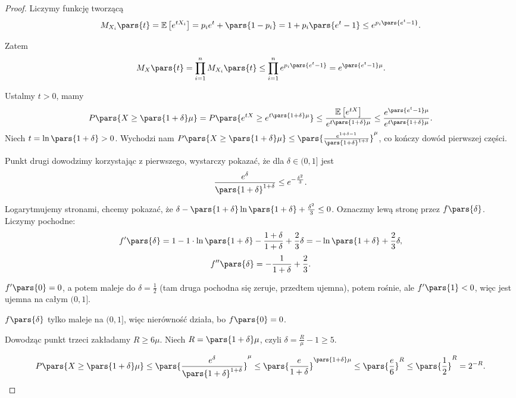 \begin{proof}
	Liczymy funkcję tworzącą \[M_{X_i} \pars{ t } = \mathbb{E}\left[ e ^{tX_i} \right] = p_ie^{t}+ \pars{ 1-p_i } = 1 + p_i \pars{ e^{t}-1 } \le e^{p_i \pars{ e^{t}-1 } } .\]

	Zatem \[M_X \pars{ t } = \prod_{i=1}^{n} M_{X_i} \pars{ t } \le \prod_{i=1}^{n} e^{p_i \pars{ e^{t}-1 } } = e^{ \pars{ e^{t}-1 } \mu}  .\]

	Ustalmy \(t > 0\), mamy \[P \pars{ X \ge \pars{ 1+\delta } \mu } = P \pars{ e ^{tX}\ge e^{t \pars{ 1+\delta } \mu} } \le \frac{\mathbb{E}\left[ e^{tX} \right] }{e^{t \pars{ 1+\delta } \mu}} \le  \frac{e^{\pars{e^{t}-1}\mu}}{e^{t \pars{ 1+\delta } \mu}} .\]
	Niech \(t = \ln \pars{ 1+\delta } > 0\). Wychodzi nam \(P \pars{ X \ge \pars{ 1+\delta } \mu } \le  \pars{\frac{e^{1+\delta-1}}{ \pars{ 1+\delta } ^{1+\delta}}} ^{\mu}\), co kończy dowód pierwszej części.

	Punkt drugi dowodzimy korzystając z pierwszego, wystarczy pokazać, że dla \(\delta \in (0,1]\) jest \[\frac{e^{\delta}}{ \pars{ 1+\delta } ^{1+\delta}} \le e^{- \frac{\delta^2}{3}}.\]

	Logarytmujemy stronami, chcemy pokazać, że \(\delta - \pars{ 1+ \delta }\ln \pars{ 1+\delta   } + \frac{\delta^2}{3} \le 0\). Oznaczmy lewą stronę przez \(f \pars{ \delta } \). Liczymy pochodne:
	\[f' \pars{ \delta } = 1- 1\cdot \ln \pars{ 1+\delta } - \frac{1+\delta}{1+\delta} + \frac{2}{3}\delta = - \ln \pars{ 1+\delta } + \frac{2}{3}\delta,\]
	\[f'' \pars{ \delta } = -\frac{1}{1+\delta} + \frac{2}{3}.\]

	\(f' \pars{ 0 } = 0\), a potem maleje do \(\delta = \frac{1}{2}\) (tam druga pochodna się zeruje, przedtem ujemna), potem rośnie, ale \(f' \pars{ 1 } < 0\), więc jest ujemna na całym \((0,1]\).

	\(f \pars{ \delta } \) tylko maleje na \((0,1]\), więc nierówność działa, bo \(f \pars{ 0 } = 0\).

	Dowodząc punkt trzeci zakładamy \(R \ge 6\mu\). Niech \(R = \pars{ 1+\delta } \mu\), czyli \(\delta = \frac{R}{\mu}-1 \ge 5\).

	\[P \pars{ X \ge \pars{ 1+\delta } \mu } \le \pars{ \frac{e^{\delta}}{ \pars{ 1+\delta } ^{1+\delta}} } ^{\mu} \le \pars{ \frac{e}{1+\delta} } ^{ \pars{ 1+\delta } \mu} \le \pars{ \frac{e}{6} } ^{R} \le \pars{ \frac{1}{2} } ^{R} = 2 ^{-R}.\]
\end{proof}

